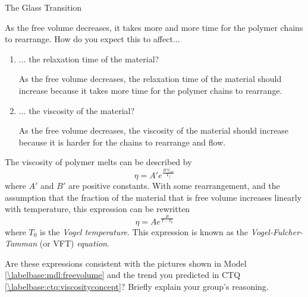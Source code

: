 \begin{activity}{The Glass Transition}
\begin{ctqs}
	\question As the free volume decreases, it takes more and more time for the polymer chains to rearrange.  How do you expect this to affect... \label{\labelbase:ctq:viscosityconcept}
	
		\begin{enumerate}
			\item ... the relaxation time of the material?
			
				\begin{solution}[0.5in]
					As the free volume decreases, the relaxation time of the material should increase because it takes more time for the polymer chains to rearrange.
				\end{solution}
			
			\item ... the viscosity of the material?
			
				\begin{solution}[0.5in]
					As the free volume decreases, the viscosity of the material should increase because it is harder for the chains to rearrange and flow.
				\end{solution}
				
		\end{enumerate}
	
\end{ctqs}

\begin{infobox}

	The viscosity of polymer melts can be described by
	\begin{equation*}
		\eta = A' e^{\frac{B' V_{occ}}{V_f}}
	\end{equation*}
	where $A'$ and $B'$ are positive constants.  With some rearrangement, and the assumption that the fraction of the material that is free volume increases linearly with temperature, this expression can be rewritten
	\begin{equation*}
		\eta = A e^{\frac{B}{T-T_0}}
	\end{equation*}
	where $T_0$ is the \emph{Vogel temperature}.  This expression is known as the \emph{Vogel-Fulcher-Tamman} (or VFT) \emph{equation}.
			
\end{infobox}

\begin{ctqs}
		
	\question Are these expressions consistent with the pictures shown in Model \ref{\labelbase:mdl:freevolume} and the trend you predicted in CTQ \ref{\labelbase:ctq:viscosityconcept}?  Briefly explain your group's reasoning.
			

\end{ctqs}
\end{activity}
